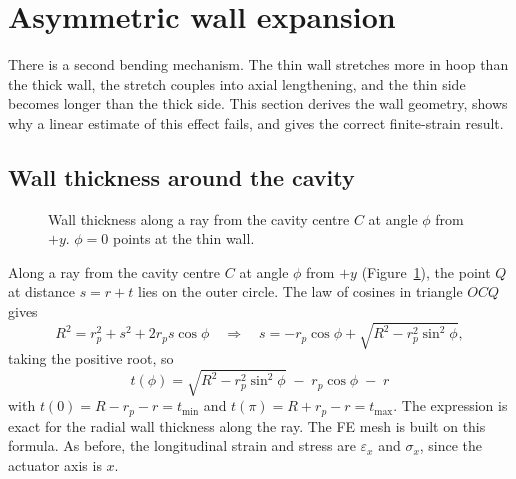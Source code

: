 \documentclass[11pt,a4paper]{article}
\numberwithin{equation}{section}
\newcommand{\rp}{r_p}
\newcommand{\tmin}{t_{\min}}
\newcommand{\tmax}{t_{\max}}
\begin{document}
\section{Asymmetric wall expansion}\label{sec:wall}

There is a second bending mechanism. The thin wall stretches more in hoop than the thick wall, the
stretch couples into axial lengthening, and the thin side becomes longer than the thick side. This section derives the wall
geometry, shows why a linear estimate of this effect fails, and gives the correct finite-strain result.

\subsection{Wall thickness around the cavity}
\begin{figure}[H]
\centering
{}
\caption{Wall thickness along a ray from the cavity centre $C$ at angle $\phi$ from $+y$. $\phi=0$ points at the thin wall.}
\label{fig:tphi}
\end{figure}
Along a ray from the cavity centre $C$ at angle $\phi$ from $+y$ (Figure~\ref{fig:tphi}), the point $Q$ at distance $s=r+t$ lies on the outer circle.
The law of cosines in triangle $OCQ$ gives
\begin{equation}
R^2 = \rp^2 + s^2 + 2\rp s\cos\phi
\quad\Longrightarrow\quad
s = -\rp\cos\phi + \sqrt{R^2-\rp^2\sin^2\phi},
\end{equation}
taking the positive root, so
\begin{equation}
\boxed{\;t(\phi) = \sqrt{R^2-\rp^2\sin^2\phi} \;-\; \rp\cos\phi \;-\; r\;} \label{eq:tphi}
\end{equation}
with $t(0) = R-\rp-r = \tmin$ and $t(\pi) = R+\rp-r = \tmax$. The expression is exact for the radial wall thickness along the ray.
The FE mesh is built on this formula. As before, the longitudinal strain and stress are $\varepsilon_x$ and $\sigma_x$, since the actuator axis is $x$.
\end{document}
